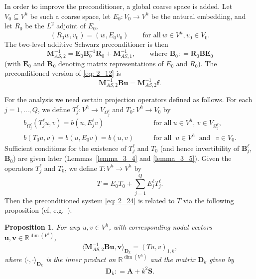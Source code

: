 \documentclass[numbers,webpdf,imaiai]{ima-authoring-template}%
\theoremstyle{thmstyletwo}%
\newtheorem{proposition}[theorem]{Proposition}%
\numberwithin{equation}{section}
\newcommand{\assign}{\mathrel{\mathop:}=}
\numberwithin{equation}{section}
\renewcommand{\kappa}{k}
\begin{document}
{In order to improve the preconditioner, a global coarse space is added.  
Let $V_0 \subseteq V^h$ be such a coarse space, let $E_0: V_0 \rightarrow V^h$ be the natural embedding, 
and let $R_0$ be the $L^2$ adjoint of $E_0$,
\begin{equation*}
	(R_0 w,v_0) = (w,E_0 v_0) \qquad \text{for all} \ w \in V^h, v_0 \in V_0.
\end{equation*}
The two-level additive Schwarz preconditioner is then 
\begin{equation} \label{eq: 2_23}
	\mathbf{M}^{-1}_{AS,2} = \mathbf{E}_0 \mathbf{B}^{-1}_0 \mathbf{R}_0 + \mathbf{M}^{-1}_{AS,1}, 
	\qquad \text{where } \mathbf{B}_0 \assign \mathbf{R}_0 \mathbf{B} \mathbf{E}_0 
\end{equation}
(with $\mathbf{E}_0$ and $\mathbf{R}_0$ denoting matrix representations of $E_0$ and $R_0$).
The preconditioned version of \eqref{eq: 2_12} is
\begin{equation} \label{eq: 2_24}
	\mathbf{M}^{-1}_{AS,2} \mathbf{B} \mathbf{u} = \mathbf{M}_{AS,2}^{-1} \mathbf{f}.
\end{equation}

For the analysis we need certain projection operators defined as follows.  
For each $j = 1, \ldots, Q$, we define  $T^\ell_j: V^h \rightarrow V_{\Omega^\ell_j}$ and  $T_0: V^h \rightarrow V_0$ by
\begin{align}
	b_{\Omega^\ell_j}(T^\ell_j u, v) = b(u, E^\ell_j v) \qquad &\text{for all} \ {u\in V^h,}\, v \in V_{\Omega^\ell_j}, 
	\label{eq: bT} 
	\\[0.5ex]
	b(T_0 u, v) = b(u, E_0 v) = b(u,v)  \qquad &\text{for all} \;\; u\in V^h \;\; \text{and} \;\;  \ v \in V_0.
	\label{eq: 2_25_zero}
\end{align}
Sufficient conditions for the existence of $T^\ell_j$ and $T_0$ (and hence invertibility of $\mathbf{B}^\ell_j$, $\mathbf{B}_0$) 
are given later (Lemmas~\ref{lemma_3_4} and \ref{lemma_3_5}).
Given the operators $T^\ell_j$ and $T_0$, we define $T: V^h \rightarrow V^h$ by  
\begin{equation}
	T = E_0T_0 + \sum_{j=1}^Q E^\ell_j T^\ell_j. \label{eq: 2_26}
\end{equation}
Then the preconditioned system \eqref{eq:  2_24} is related to $T$ via the following proposition
(cf, e.g.\ \cite[Theorem~5.5]{Graham:2017:DDP}).

\begin{proposition}\label{prop: 2_6}
For any $u,v \in V^h$, with corresponding nodal vectors $\mathbf{u},\mathbf{v} \in \mathbb{R}^{\dim(V^h)}$, 
\begin{equation} \label{eq: 2_27}
	\langle \mathbf{M}_{AS,2}^{-1} \mathbf{B} \mathbf{u}, \mathbf{v} \rangle_{\mathbf{D}_\kappa} = (T u, v)_{1, \kappa},
\end{equation}
where $\langle \cdot , \cdot \rangle_{\mathbf{D}_\kappa}$ is the inner product on $\mathbb{R}^{\dim(V^h)}$ and the matrix $\mathbf{D}_\kappa$
given by
\begin{equation}\label{def:Dk}
    \mathbf{D}_\kappa \assign \mathbf{A} + \kappa^2  \mathbf{S}.
\end{equation}
\end{proposition}


}
\end{document}
